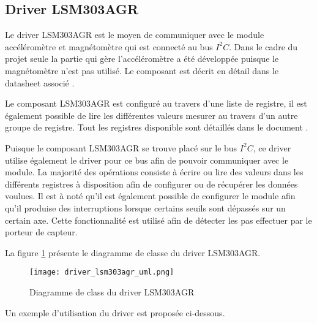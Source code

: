 \subsection{Driver LSM303AGR}

Le driver LSM303AGR est le moyen de communiquer avec le module accéléromètre et magnétomètre qui est connecté au bus $I^{2}C$. Dans le cadre du projet seule la partie qui gère l'accéléromètre a été développée puisque le magnétomètre n'est pas utilisé. Le composant est décrit en détail dans le datasheet associé \cite{lsm303agr-datasheet}.

Le composant LSM303AGR est configuré au travers d'une liste de registre, il est également possible de lire les différentes valeurs mesurer au travers d'un autre groupe de registre. Tout les registres disponible sont détaillés dans le document \cite[p.~43]{lsm303agr-datasheet}.

Puisque le composant LSM303AGR se trouve placé sur le bus $I^{2}C$, ce driver utilise également le driver pour ce bus afin de pouvoir communiquer avec le module. La majorité des opérations consiste à écrire ou lire des valeurs dans les différents registres à disposition afin de configurer ou de récupérer les données voulues. Il est à noté qu'il est également possible de configurer le module afin qu'il produise des interruptions lorsque certains seuils sont dépassés sur un certain axe. Cette fonctionnalité est utilisé afin de détecter les pas effectuer par le porteur de capteur.


La figure \ref{fig:driver_lsm303agr_uml} présente le diagramme de classe du driver LSM303AGR.

\begin{figure}[htb]
\centering 
\texttt{[image: driver\_lsm303agr\_uml.png]} 
\caption{Diagramme de class du driver LSM303AGR}
\label{fig:driver_lsm303agr_uml}
\end{figure}

Un exemple d'utilisation du driver est proposée ci-dessous.

